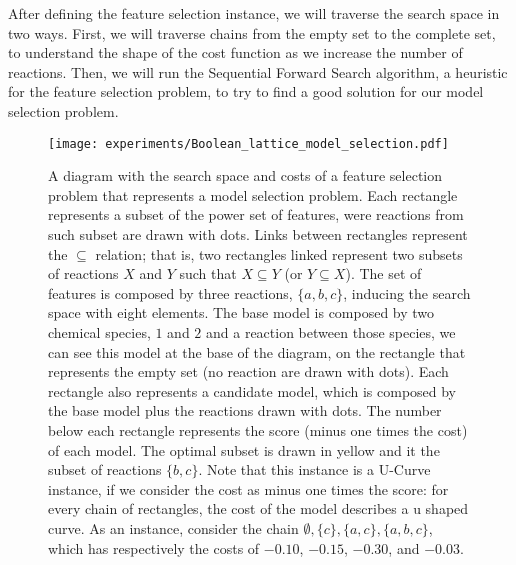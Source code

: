 After defining the feature selection instance, we will traverse the
search space in two ways. First, we will traverse chains from the empty
set to the complete set, to understand the shape of the cost function as
we increase the number of reactions. Then, we will run the Sequential 
Forward Search algorithm, a heuristic for the feature selection problem,
to try to find a good solution for our model selection problem.

\begin{figure}[h]
\begin{center}
    \texttt{[image: experiments/Boolean\_lattice\_model\_selection.pdf]}
    \caption{A diagram with the search space and costs of a feature 
    selection problem that represents a model selection problem. Each 
    rectangle represents a subset of the power set of features, were
    reactions from such subset are drawn with dots. Links between 
    rectangles represent the $\subseteq$ relation; that is, two 
    rectangles linked represent two subsets of reactions $X$ and $Y$ 
    such that $X \subseteq Y$ (or $Y \subseteq X$). The set of features 
    is composed by three reactions, $\{a, b, c\}$, inducing the search 
    space with eight elements. The base model is composed by two 
    chemical species, $1$ and $2$ and a reaction between those species, 
    we can see this model at the base of the diagram, on the rectangle 
    that represents the empty set (no reaction are drawn with dots). 
    Each rectangle also represents a candidate model, which is composed 
    by the base model plus the reactions drawn with dots. The number
    below each rectangle represents the score (minus one times the cost)
    of each model. The optimal subset is drawn in yellow and it the
    subset of reactions $\{b, c\}$. Note that this instance is a U-Curve 
    instance, if we consider the cost as minus one times the score: for 
    every chain of rectangles, the cost of the model describes a u 
    shaped curve. As an instance, consider the chain $\emptyset, \{c\} 
    , \{a, c\}, \{a, b, c\}$, which has respectively the costs of
    $-0.10$, $-0.15$, $-0.30$, and $-0.03$.}
    \label{fig:feature_selection_model_selection}
    \end{center}
\end{figure}





